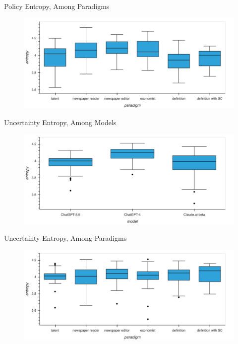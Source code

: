 \documentclass[12pt]{beamer}
\begin{document}
\begin{frame}{Policy Entropy, Among Paradigms}
\begin{figure}[H]
\centering
\includegraphics[width=11.5cm]{Figures/fig12.png}
\end{figure}
\end{frame}


\begin{frame}{Uncertainty Entropy, Among Models}
\begin{figure}[H]
\centering
\includegraphics[width=11.5cm]{Figures/fig13.png}
\end{figure}
\end{frame}


\begin{frame}{Uncertainty Entropy, Among Paradigms}
\begin{figure}[H]
\centering
\includegraphics[width=11.5cm]{Figures/fig14.png}
\end{figure}
\end{frame}
\end{document}
